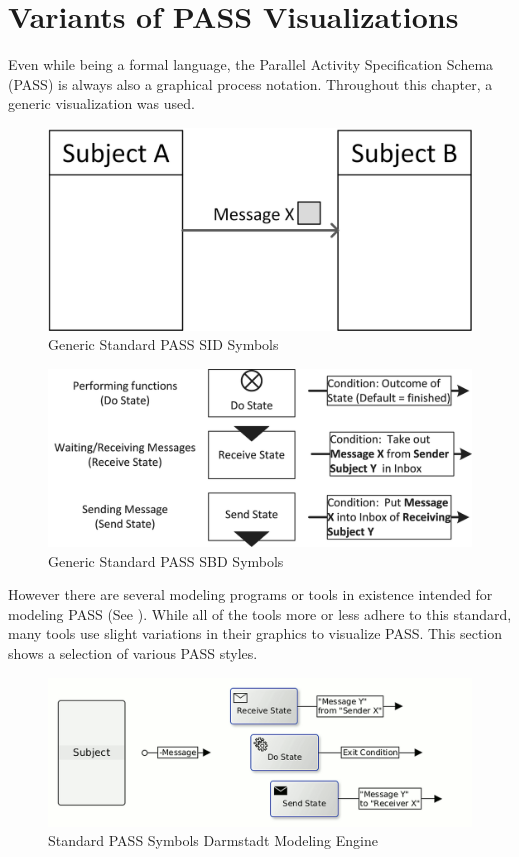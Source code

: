 \newpage
\section{Variants of PASS Visualizations}

Even while being a formal language, the Parallel Activity Specification Schema (PASS) is always also a graphical process notation. Throughout this chapter, a generic visualization was used.

\begin{figure}[htbp]
	\centering
	\includegraphics[width=0.6\linewidth]{Figures/Ontology/SubjectInteraction/GenericPASSSIDSymbols.png}
	\caption[Generic Standard PASS SID Symbols]{Generic Standard PASS SID Symbols}
	\label{fig:genericPASSSIDSymbols}
\end{figure}

\begin{figure}[htbp]
	\centering
	\includegraphics[width=0.8\linewidth]{Figures/Ontology/SubjectBehavior/Behavior-Symbole_NEW2.png}
	\caption[Generic Standard PASS SBD Symbols]{Generic Standard PASS SBD Symbols}
	\label{fig:genericPASSSymbols}
\end{figure}

However there are several modeling programs or tools in existence intended for modeling PASS (See  \cite{toolOverview}). While all of the tools more or less adhere to this standard, many tools use slight variations in their graphics to visualize PASS. This section shows a selection of various PASS styles. 



\begin{figure}[htbp]
	\centering
	\includegraphics[width=0.9\linewidth]{Figures/Ontology/BaseElementsOverviewDarmstadt.png}
	\caption[Standard PASS Symbols Darmstadt Modeling Engine]{Standard PASS Symbols Darmstadt Modeling Engine}
	\label{fig:darmstadtPassSymbols}
\end{figure}

